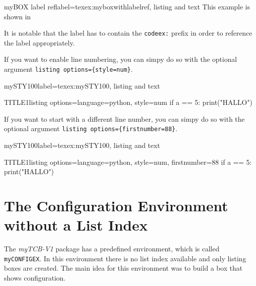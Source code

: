 \documentclass[]{myHOWTO-V001}
\begin{document}
\begin{myTEXEXdoclst}{myBOX label ref}{label={texex:myboxwithlabelref}, listing and text}
This example is shown in 
\end{myTEXEXdoclst}

It is notable that the label has to contain the \Verb|codeex:| prefix in order to reference the label appropriately.

If you want to enable line numbering, you can simpy do so with the optional argument \verb|listing options={style=num}|.

\begin{myTEXEXdoclst}{mySTY100}{label={texex:mySTY100}, listing and text}
\begin{myCODEEXlst}{TITLE1}{listing options={language=python, style=num}}
if a == 5:
	print("HALLO")
\end{myCODEEXlst}
\end{myTEXEXdoclst}

If you want to start with a different line number, you can simpy do so with the optional argument \verb|listing options={firstnumber=88}|.

\begin{myTEXEXdoclst}{mySTY100}{label={texex:mySTY100}, listing and text}
\begin{myCODEEXlst}{TITLE1}{listing options={language=python, style=num, firstnumber=88}}
if a == 5:
	print("HALLO")
\end{myCODEEXlst}
\end{myTEXEXdoclst}

%
%

\section{The Configuration Environment without a List Index}

The \emph{myTCB-V1} package has a predefined environment, which is called \Verb|myCONFIGEX|. In this environment there is no list index available and only listing boxes are created. The main idea for this environment was to build a box that shows configuration.
\end{document}
